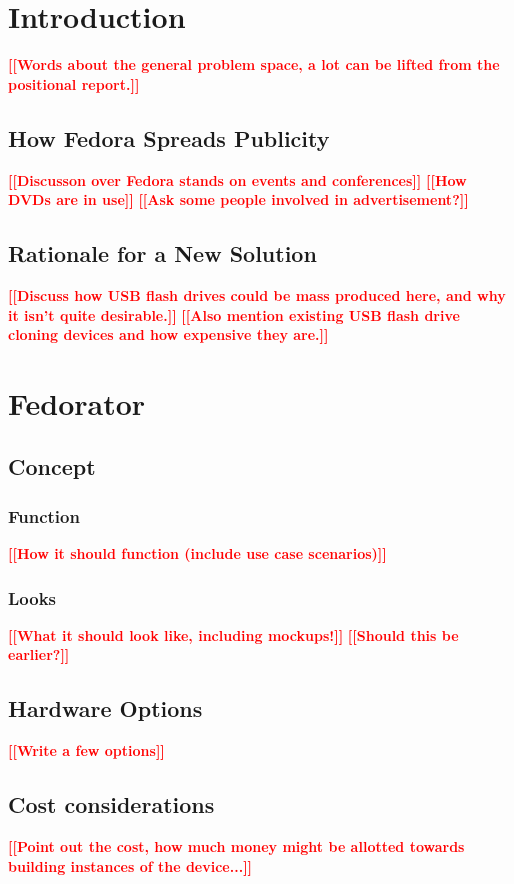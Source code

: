 \documentclass[thesis=B,english,hidelinks]{template/FITthesisXE}
\newcommand{\todo}[1]{\textcolor{red}{\textbf{[[#1]]}}}
\newcommand{\blind}[1][1]{
    \textcolor{gray}{\Blindtext[#1][1]}
}
\begin{document}
\chapter{Introduction}
    \todo{Words about the general problem space, a lot can be lifted from the positional report.}
    \blind[2]
    \section{How Fedora Spreads Publicity}
        \todo{Discusson over Fedora stands on events and conferences}
        \todo{How DVDs are in use}
        \todo{Ask some people involved in advertisement?}
        \blind[3]
    \section{Rationale for a New Solution}
        \todo{Discuss how USB flash drives could be mass produced here, and why it isn't quite desirable.}
        \todo{Also mention existing USB flash drive cloning devices and how expensive they are.}
        \blind[3]
\chapter{Fedorator}
    \section{Concept}
        \subsection{Function}
            \todo{How it should function (include use case scenarios)}
            \blind[3]
        \subsection{Looks}
            \todo{What it should look like, including mockups!}
            \todo{Should this be earlier?}
            \blind[3]
    \section{Hardware Options}
        \todo{Write a few options}
        \blind[4]
    \section{Cost considerations}
        \todo{Point out the cost, how much money might be allotted towards building instances of the device...}
        \blind[2]
\end{document}
